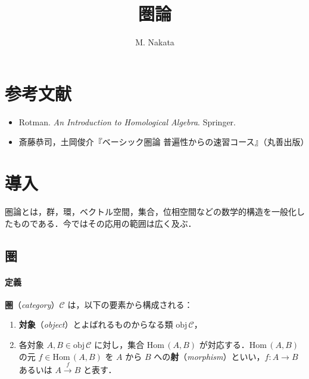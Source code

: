 \documentclass[b5paper,pandoc]{bxjsarticle}
\title{圏論}
\author{M. Nakata}
\date{}
\providecommand{\tightlist}{%
  \setlength{\itemsep}{0pt}\setlength{\parskip}{0pt}}
\let\oldparagraph\paragraph
\renewcommand{\paragraph}[1]{\oldparagraph{#1}\mbox{}}
\begin{document}
\maketitle

{
\setcounter{tocdepth}{3}
\tableofcontents
}
\hypertarget{ux53c2ux8003ux6587ux732e}{%
\section{参考文献}\label{ux53c2ux8003ux6587ux732e}}

\begin{itemize}
\tightlist
\item
  Rotman. \emph{An Introduction to Homological Algebra}. Springer.
\item
  斎藤恭司，土岡俊介『ベーシック圏論
  普遍性からの速習コース』（丸善出版）
\end{itemize}

\hypertarget{topology-introduction}{%
\section{導入}\label{topology-introduction}}

圏論とは，群，環，ベクトル空間，集合，位相空間などの数学的構造を一般化したものである．今ではその応用の範囲は広く及ぶ．

\hypertarget{ux570f}{%
\subsection{圏}\label{ux570f}}

\hypertarget{ux5b9aux7fa9}{%
\paragraph{定義}\label{ux5b9aux7fa9}}

\textbf{圏}（\emph{category}）\(\mathscr C\)
は，以下の要素から構成される：

\begin{enumerate}
\def\labelenumi{\roman{enumi})}
\tightlist
\item
  \textbf{対象}（\emph{object}）とよばれるものからなる類
  \(\mathrm{obj}\,\mathscr C\)，
\item
  各対象 \(A, B \in \mathrm{obj}\,\mathscr C\) に対し，集合
  \(\mathrm{Hom}\,(A, B)\) が対応する．\(\mathrm{Hom}\,(A,B)\) の元
  \(f \in \mathrm{Hom}\,(A,B)\) を \(A\) から \(B\)
  への\textbf{射}（\emph{morphism}）といい，\(f \colon A \to B\)
  あるいは \(A \xrightarrow{f} B\) と表す．
\end{enumerate}
\end{document}
